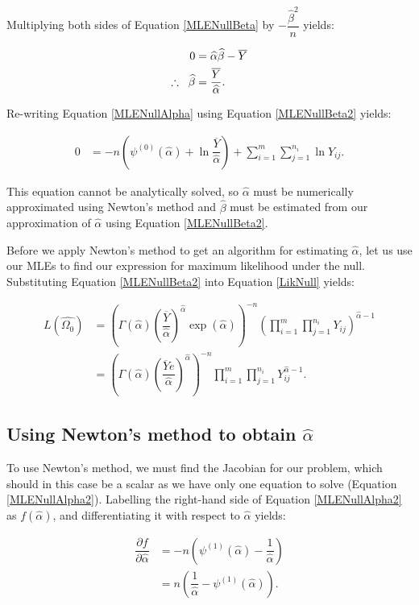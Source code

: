\documentclass[12pt,a4paper,openright]{article}
\newcommand{\eqn}[1]{Equation \ref{#1}}
\newcommand{\ovY}{\overline{Y}}
\newcommand{\wal}{\widehat{\alpha}}
\newcommand{\wbe}{\widehat{\beta}}
\begin{document}
	Multiplying both sides of \eqn{MLENullBeta} by $-\dfrac{\wbe^2}{n}$ yields:
	
	\begin{align}
		0 &= \wal\wbe - \ovY \nonumber \\
		\therefore \hspace{0.2cm} \wbe &= \dfrac{\ovY}{\wal}. \label{MLENullBeta2}
	\end{align}

	Re-writing \eqn{MLENullAlpha} using \eqn{MLENullBeta2} yields:
	
	\begin{align}
		0 &= -n\left(\psi^{(0)}(\wal)+\ln{\dfrac{\ovY}{\wal}}\right) + \sum_{i=1}^{m} \sum_{j=1}^{n_i} \ln{Y_{ij}}.\label{MLENullAlpha2}
	\end{align}

	This equation cannot be analytically solved, so $\wal$ must be numerically approximated using Newton's method and $\wbe$ must be estimated from our approximation of $\wal$ using \eqn{MLENullBeta2}.
	
	Before we apply Newton's method to get an algorithm for estimating $\wal$, let us use our MLEs to find our expression for maximum likelihood under the null. Substituting \eqn{MLENullBeta2} into \eqn{LikNull} yields:
	
	\begin{align}
		L(\widehat{\Omega_0}) &= \left(\Gamma(\wal)\left(\dfrac{\ovY}{\wal}\right)^{\wal}\exp(\wal)\right)^{-n} \left(\prod_{i=1}^m \prod_{j=1}^{n_i} Y_{ij}\right)^{\wal-1} \nonumber\\
		&= \left(\Gamma(\wal)\left(\dfrac{\ovY e}{\wal}\right)^{\wal}\right)^{-n} \prod_{i=1}^m \prod_{j=1}^{n_i} Y_{ij}^{\wal-1}. \label{MLNull}
	\end{align}
	
	\subsection{Using Newton's method to obtain $\wal$}
	To use Newton's method, we must find the Jacobian for our problem, which should in this case be a scalar as we have only one equation to solve (\eqn{MLENullAlpha2}). Labelling the right-hand side of \eqn{MLENullAlpha2} as $f(\wal)$, and differentiating it with respect to $\wal$ yields:
	
	\begin{align*}
		\dfrac{\partial f}{\partial \wal} &= -n\left(\psi^{(1)}(\wal) - \dfrac{1}{\wal}\right) \\
		&= n\left(\dfrac{1}{\wal} - \psi^{(1)}(\wal)\right).
	\end{align*}
\end{document}
